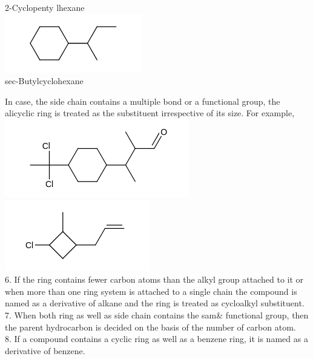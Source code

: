 \documentclass[10pt]{article}
\begin{document}
2-Cyclopenty lhexane\\
\includegraphics{smile-a476d78bf828265a9b007a93c2b1d0a9fc419169}\\
sec-Butylcyclohexane

In case, the side chain contains a multiple bond or a functional group, the alicyclic ring is treated as the substituent irrespective of its size. For example,\\
\includegraphics{smile-4d121408369950fed0314d755fa951e309006ff3}\\
\includegraphics{smile-14c5e1327d6fa730463d2c21d303d40eb4bd5bbf}\\
6. If the ring contains fewer carbon atoms than the alkyl group attached to it or when more than one ring system is attached to a single chain the compound is named as a derivative of alkane and the ring is treated as cycloalkyl substituent.\\
7. When both ring as well as side chain contains the sam\& functional group, then the parent hydrocarbon is decided on the basis of the number of carbon atom.\\
8. If a compound contains a cyclic ring as well as a benzene ring, it is named as a derivative of benzene.
\end{document}
